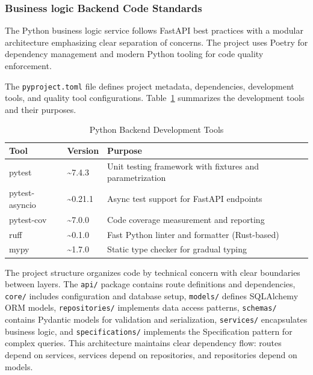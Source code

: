 \documentclass[12pt,a4paper]{article}
\begin{document}
\subsubsection{Business logic Backend Code Standards}

The Python business logic service follows FastAPI best practices with a modular architecture emphasizing clear separation of concerns. The project uses Poetry for dependency management and modern Python tooling for code quality enforcement.\newline

The \texttt{pyproject.toml} file defines project metadata, dependencies, development tools, and quality tool configurations. Table~\ref{tab:python_tools} summarizes the development tools and their purposes.\newline

\begin{table}[htbp]
	\centering
	\caption{Python Backend Development Tools}
	\label{tab:python_tools}
	\begin{tabular}{@{}llp{6cm}@{}}
		\toprule
		\textbf{Tool} & \textbf{Version} & \textbf{Purpose} \\ 
		\midrule
		pytest & \textasciitilde7.4.3 & Unit testing framework with fixtures and parametrization \\
		pytest-asyncio & \textasciitilde0.21.1 & Async test support for FastAPI endpoints \\
		pytest-cov & \textasciitilde7.0.0 & Code coverage measurement and reporting \\
		ruff & \textasciitilde0.1.0 & Fast Python linter and formatter (Rust-based) \\
		mypy & \textasciitilde1.7.0 & Static type checker for gradual typing \\
		\bottomrule
	\end{tabular}
\end{table}

The project structure organizes code by technical concern with clear boundaries between layers. The \texttt{api/} package contains route definitions and dependencies, \texttt{core/} includes configuration and database setup, \texttt{models/} defines SQLAlchemy ORM models, \texttt{repositories/} implements data access patterns, \texttt{schemas/} contains Pydantic models for validation and serialization, \texttt{services/} encapsulates business logic, and \texttt{specifications/} implements the Specification pattern for complex queries. This architecture maintains clear dependency flow: routes depend on services, services depend on repositories, and repositories depend on models.\newline
\end{document}
